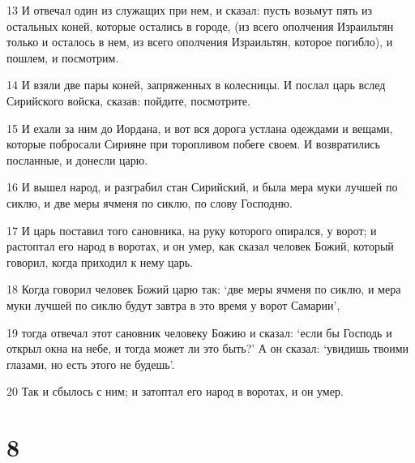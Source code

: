 \par 13 И отвечал один из служащих при нем, и сказал: пусть возьмут пять из остальных коней, которые остались в городе, (из всего ополчения Израильтян только и осталось в нем, из всего ополчения Израильтян, которое погибло), и пошлем, и посмотрим.
\par 14 И взяли две пары коней, запряженных в колесницы. И послал царь вслед Сирийского войска, сказав: пойдите, посмотрите.
\par 15 И ехали за ним до Иордана, и вот вся дорога устлана одеждами и вещами, которые побросали Сирияне при торопливом побеге своем. И возвратились посланные, и донесли царю.
\par 16 И вышел народ, и разграбил стан Сирийский, и была мера муки лучшей по сиклю, и две меры ячменя по сиклю, по слову Господню.
\par 17 И царь поставил того сановника, на руку которого опирался, у ворот; и растоптал его народ в воротах, и он умер, как сказал человек Божий, который говорил, когда приходил к нему царь.
\par 18 Когда говорил человек Божий царю так: `две меры ячменя по сиклю, и мера муки лучшей по сиклю будут завтра в это время у ворот Самарии',
\par 19 тогда отвечал этот сановник человеку Божию и сказал: `если бы Господь и открыл окна на небе, и тогда может ли это быть?' А он сказал: `увидишь твоими глазами, но есть этого не будешь'.
\par 20 Так и сбылось с ним; и затоптал его народ в воротах, и он умер.

\chapter{8}


